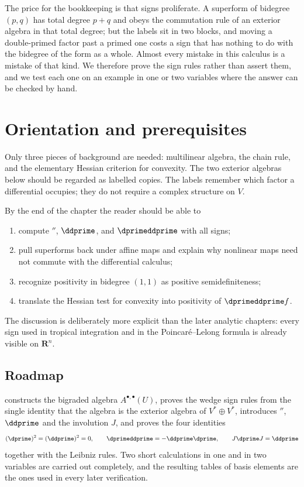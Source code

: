 The price for the bookkeeping is that signs proliferate.  A superform of
bidegree $(p,q)$ has total degree $p+q$ and obeys the commutation rule of an
exterior algebra in that total degree; but the labels sit in two blocks, and
moving a double-primed factor past a primed one costs a sign that has nothing
to do with the bidegree of the form as a whole.  Almost every mistake in this
calculus is a mistake of that kind.  We therefore prove the sign rules rather
than assert them, and we test each one on an example in one or two variables
where the answer can be checked by hand.

\section{Orientation and prerequisites}
\label{sec:ch09-orientation}

Only three pieces of background are needed: multilinear algebra, the chain
rule, and the elementary Hessian criterion for convexity.  The two exterior
algebras below should be regarded as labelled copies.  The labels remember
which factor a differential occupies; they do not require a complex
structure on $V$.

By the end of the chapter the reader should be able to
\begin{enumerate}
\item compute $\dprime$, $\ddprime$, and $\dprimeddprime$ with all signs;
\item pull superforms back under affine maps and explain why nonlinear maps
  need not commute with the differential calculus;
\item recognize positivity in bidegree $(1,1)$ as positive semidefiniteness;
\item translate the Hessian test for convexity into positivity of
  $\dprimeddprime f$.
\end{enumerate}
The discussion is deliberately more explicit than the later analytic
chapters: every sign used in tropical integration and in the
Poincar\'e--Lelong formula is already visible on $\mathbf R^n$.

\subsection*{Roadmap}

 constructs the bigraded algebra
$A^{\bullet,\bullet}(U)$, proves the wedge sign rules from the single
identity that the algebra is the exterior algebra of $V^*\oplus V^*$,
introduces $\dprime$, $\ddprime$ and the involution $J$, and proves the four
identities
\[
 (\dprime)^2=(\ddprime)^2=0,
 \qquad
 \dprimeddprime=-\ddprime\dprime,
 \qquad
 J\dprime J=\ddprime
\]
together with the Leibniz rules.  Two short calculations in one and in two
variables are carried out completely, and the resulting tables of basis
elements are the ones used in every later verification.

